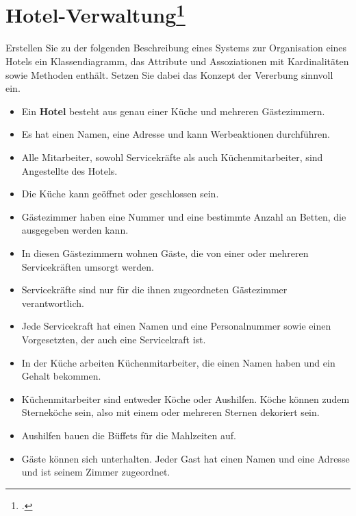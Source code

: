\documentclass{lehramt-informatik}
\begin{document}
%

\section{Hotel-Verwaltung\footcite[leicht verändert]{examen:46116:2012:03}}

Erstellen Sie zu der folgenden Beschreibung eines Systems zur
Organisation eines Hotels ein Klassendiagramm, das Attribute und
Assoziationen mit Kardinalitäten sowie Methoden enthält. Setzen Sie
dabei das Konzept der Vererbung sinnvoll ein.

\begin{itemize}
\item Ein \textbf{Hotel} besteht aus genau einer Küche und mehreren Gästezimmern.

\item Es hat einen Namen, eine Adresse und kann Werbeaktionen
durchführen.

\item Alle Mitarbeiter, sowohl Servicekräfte als auch
Küchenmitarbeiter, sind Angestellte des Hotels.

\item Die Küche kann geöffnet oder geschlossen sein.

\item Gästezimmer haben eine Nummer und eine bestimmte Anzahl an Betten,
die ausgegeben werden kann.

\item In diesen Gästezimmern wohnen Gäste, die von einer oder mehreren
Servicekräften umsorgt werden.

\item Servicekräfte sind nur für die ihnen zugeordneten Gästezimmer
verantwortlich.

\item Jede Servicekraft hat einen Namen und eine Personalnummer sowie
einen Vorgesetzten, der auch eine Servicekraft ist.

\item In der Küche arbeiten Küchenmitarbeiter, die einen Namen haben und
ein Gehalt bekommen.

\item Küchenmitarbeiter sind entweder Köche oder Aushilfen. Köche können
zudem Sterneköche sein, also mit einem oder mehreren Sternen dekoriert
sein.

\item Aushilfen bauen die Büffets für die Mahlzeiten auf.

\item Gäste können sich unterhalten. Jeder Gast hat einen Namen und eine
Adresse und ist seinem Zimmer zugeordnet.
\end{itemize}
\end{document}
